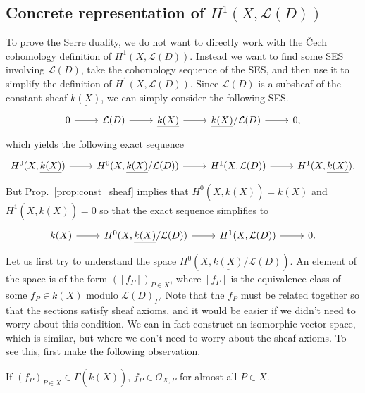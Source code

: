 \documentclass[12pt]{article}
\begin{document}
\subsection{Concrete representation of $H^{1}(X,\mathcal{L}(D))$}
To prove the Serre duality, we do not want to directly work with the \v Cech
cohomology definition of $H^{1}(X,\mathcal{L}(D))$.
Instead we want to find some SES involving $\mathcal{L}(D)$,
take the cohomology sequence of the SES, and then use it to simplify
the definition of $H^{1}(X,\mathcal{L}(D))$. Since $\mathcal{L}(D)$ is
a subsheaf of the constant sheaf $\underline{k(X)}$, we can simply consider
the following SES.
\[
  \begin{tikzcd}
    0\arrow{r} & \mathcal{L}(D)\arrow{r} & \underline{k(X)}\arrow{r}
    & \underline{k(X)}/\mathcal{L}(D)\arrow{r} & 0,
  \end{tikzcd}
\]
which yields the following exact sequence
\[
  \begin{tikzcd}
    H^{0}(X,\underline{k(X)})\arrow{r} & H^{0}(X,\underline{k(X)}
    /\mathcal{L}(D))\arrow{r} & H^{1}(X,\mathcal{L}(D))\arrow{r}
    & H^{1}(X,\underline{k(X)}).
  \end{tikzcd}
\]
But Prop.~\ref{prop:const_sheaf} implies that
$H^{0}(X,\underline{k(X)})=k(X)$ and $H^{1}(X,\underline{k(X)})=0$
so that the exact sequence simplifies to
\[
  \begin{tikzcd}
    k(X)\arrow{r} & H^{0}(X,\underline{k(X)}/\mathcal{L}(D))\arrow{r}
    & H^{1}(X,\mathcal{L}(D))\arrow{r} & 0.
  \end{tikzcd}
\]
Let us first try to understand the space
$H^{0}(X,\underline{k(X)}/\mathcal{L}(D))$. An element of the space
is of the form $([f_{P}])_{P\in X}$, where $[f_{P}]$ is the equivalence
class of some $f_{P}\in k(X)$ modulo $\mathcal{L}(D)_{P}$.
Note that the $f_{P}$ must be related together so that the sections
satisfy sheaf axioms, and it would be easier if we didn't need to worry about
this condition. We can in fact construct an isomorphic vector space, which is
similar, but where we don't need to worry about the sheaf axioms. To see
this, first make the following observation.
\begin{prop}
  If $(f_{P})_{P\in X}\in \Gamma(\underline{k(X)})$,
  $f_{P}\in\mathscr{O}_{X,P}$ for almost all $P\in X$.
\end{prop}
\end{document}
